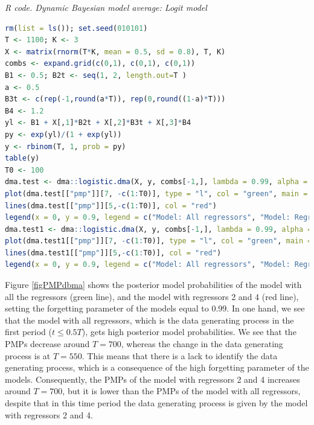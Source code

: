 \begin{enumerate}[leftmargin=*]
\begin{tcolorbox}[enhanced,width=4.67in,center upper,
	fontupper=\large\bfseries,drop shadow southwest,sharp corners]
	\textit{R code. Dynamic Bayesian model average: Logit model}
	\begin{VF}
		\begin{lstlisting}[language=R]
rm(list = ls()); set.seed(010101)
T <- 1100; K <- 3
X <- matrix(rnorm(T*K, mean = 0.5, sd = 0.8), T, K)
combs <- expand.grid(c(0,1), c(0,1), c(0,1))
B1 <- 0.5; B2t <- seq(1, 2, length.out=T )
a <- 0.5
B3t <- c(rep(-1,round(a*T)), rep(0,round((1-a)*T)))
B4 <- 1.2
yl <- B1 + X[,1]*B2t + X[,2]*B3t + X[,3]*B4
py <- exp(yl)/(1 + exp(yl))
y <- rbinom(T, 1, prob = py)
table(y)
T0 <- 100
dma.test <- dma::logistic.dma(X, y, combs[-1,], lambda = 0.99, alpha = 0.99, initialsamp = T0)
plot(dma.test[["pmp"]][7, -c(1:T0)], type = "l", col = "green", main = "Posterior model probability: Model all regressors vs model regressors 1 and 3", xlab = "Time", ylab = "PMP", ylim = c(0, 1))
lines(dma.test[["pmp"]][5,-c(1:T0)], col = "red")
legend(x = 0, y = 0.9, legend = c("Model: All regressors", "Model: Regressors 1 and 3"), col = c("green", "red"), lty=1:1, cex=0.8)
dma.test1 <- dma::logistic.dma(X, y, combs[-1,], lambda = 0.99, alpha = 0.95, initialsamp = T0)
plot(dma.test1[["pmp"]][7, -c(1:T0)], type = "l", col = "green", main = "Posterior model probability: Model all regressors vs model regressors 1 and 3", xlab = "Time", ylab = "PMP", ylim = c(0, 1))
lines(dma.test1[["pmp"]][5,-c(1:T0)], col = "red")
legend(x = 0, y = 0.9, legend = c("Model: All regressors", "Model: Regressors 1 and 3"), col = c("green", "red"), lty=1:1, cex=0.8)
\end{lstlisting}
	\end{VF}
\end{tcolorbox} 

Figure \ref{figPMPdbma} shows the posterior model probabilities of the model with all the regressors (green line), and the model with regressors 2 and 4 (red line), setting the forgetting parameter of the models equal to 0.99. In one hand, we see that the model with all regressors, which is the data generating process in the first period ($t\leq 0.5T$), gets high posterior model probabilities. We see that the PMPs decrease around $T=700$, whereas the change in the data generating process is at $T=550$. This means that there is a lack to identify the data generating process, which is a consequence of the high forgetting parameter of the models. Consequently, the PMPs of the model with regressors 2 and 4 increases around $T=700$, but it is lower than the PMPs of the model with all regressors, despite that in this time period the data generating process is given by the model with regressors 2 and 4. 


\end{enumerate}
